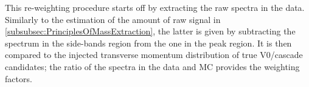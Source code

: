 This re-weighting procedure starts off by extracting the raw \pT spectra in the data. Similarly to the estimation of the amount of raw signal in \Sec\ref{subsubsec:PrinciplesOfMassExtraction}, the latter is given by subtracting the \pT spectrum in the side-bands region from the one in the peak region. It is then compared to the injected transverse momentum distribution of true V0/cascade candidates; the ratio of the \pT spectra in the data and MC provides the weighting factors.


\begin{figure}[!t]
\hspace*{-1.5cm}
\hspace*{-1.5cm}
\end{figure}
